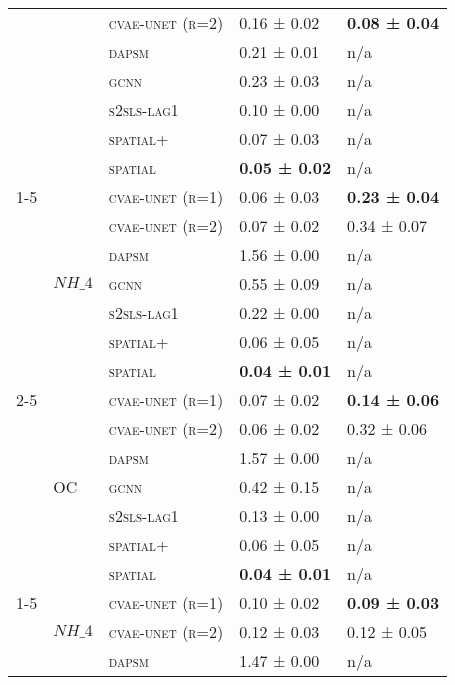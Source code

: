 \documentclass{article}
\begin{document}
\begin{table}[!tbp]
\begin{tabular}{lllll}
 &  & \textsc{cvae-unet (r=2)} & 0.16 ± {\small 0.02} & \bf 0.08 ± {\small 0.04} \\
 &  & \textsc{dapsm} & 0.21 ± {\small 0.01} & n/a \\
 &  & \textsc{gcnn} & 0.23 ± {\small 0.03} & n/a \\
 &  & \textsc{s2sls-lag1} & 0.10 ± {\small 0.00} & n/a \\
 &  & \textsc{spatial+} & 0.07 ± {\small 0.03} & n/a \\
 &  & \textsc{spatial} & \bf 0.05 ± {\small 0.02} & n/a \\
\cline{1-5} \cline{2-5}
\multirow[t]{14}{*}{$ (SC)\; SO\_{4} \;\to\; PM\_{2.5}\; (r=1) $} & \multirow[t]{7}{*}{$ NH\_{4} $} & \textsc{cvae-unet (r=1)} & 0.06 ± {\small 0.03} & \bf 0.23 ± {\small 0.04} \\
 &  & \textsc{cvae-unet (r=2)} & 0.07 ± {\small 0.02} & 0.34 ± {\small 0.07} \\
 &  & \textsc{dapsm} & 1.56 ± {\small 0.00} & n/a \\
 &  & \textsc{gcnn} & 0.55 ± {\small 0.09} & n/a \\
 &  & \textsc{s2sls-lag1} & 0.22 ± {\small 0.00} & n/a \\
 &  & \textsc{spatial+} & 0.06 ± {\small 0.05} & n/a \\
 &  & \textsc{spatial} & \bf 0.04 ± {\small 0.01} & n/a \\
\cline{2-5}
 & \multirow[t]{7}{*}{OC} & \textsc{cvae-unet (r=1)} & 0.07 ± {\small 0.02} & \bf 0.14 ± {\small 0.06} \\
 &  & \textsc{cvae-unet (r=2)} & 0.06 ± {\small 0.02} & 0.32 ± {\small 0.06} \\
 &  & \textsc{dapsm} & 1.57 ± {\small 0.00} & n/a \\
 &  & \textsc{gcnn} & 0.42 ± {\small 0.15} & n/a \\
 &  & \textsc{s2sls-lag1} & 0.13 ± {\small 0.00} & n/a \\
 &  & \textsc{spatial+} & 0.06 ± {\small 0.05} & n/a \\
 &  & \textsc{spatial} & \bf 0.04 ± {\small 0.01} & n/a \\
\cline{1-5} \cline{2-5}
\multirow[t]{14}{*}{$ (SC)\; SO\_{4} \;\to\; PM\_{2.5}\; (r=2) $} & \multirow[t]{7}{*}{$ NH\_{4} $} & \textsc{cvae-unet (r=1)} & 0.10 ± {\small 0.02} & \bf 0.09 ± {\small 0.03} \\
 &  & \textsc{cvae-unet (r=2)} & 0.12 ± {\small 0.03} & 0.12 ± {\small 0.05} \\
 &  & \textsc{dapsm} & 1.47 ± {\small 0.00} & n/a \\

\end{tabular}
\end{table}
\end{document}
